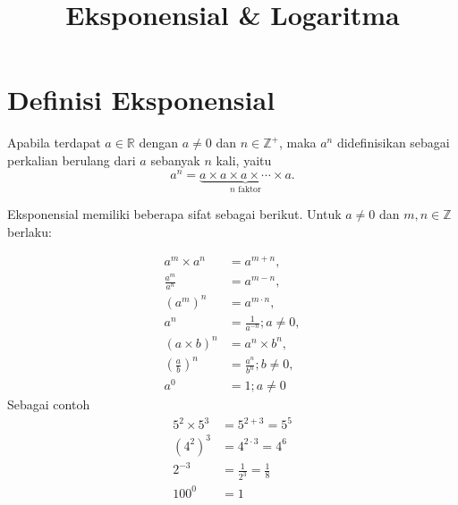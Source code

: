 \documentclass{article}
\title{\textbf{Eksponensial \& Logaritma}}
\begin{document}
\onehalfspacing

\maketitle

\section{Definisi Eksponensial}

Apabila terdapat $a \in \mathbb{R}$ dengan $a \neq 0$ dan $n \in \mathbb{Z}^+$, maka $a^n$ didefinisikan sebagai perkalian berulang dari $a$ sebanyak $n$ kali, yaitu
\[
a^n = \underbrace{a \times a \times a \times \cdots \times a}_{n\text{ faktor}}.
\]

Eksponensial memiliki beberapa sifat sebagai berikut. Untuk $a \neq 0$ dan $m,n \in \mathbb{Z}$ berlaku:

\[
\begin{aligned}
a^m \times a^n &= a^{m+n},\\
\frac{a^m}{a^n} &= a^{m-n},\\
(a^m)^n &= a^{m \cdot n},\\
a^n &= \frac{1}{a^{-n}};a \neq 0,\\
(a \times b)^n &=a^n \times b^n ,\\
\left( \frac{a}{b}\right)^n &= \frac{a^n}{b^n};b\neq 0,\\
a^0 &= 1;a \neq 0
\end{aligned}
\]
Sebagai contoh
\[
\begin{aligned}
    5^2 \times 5^3 &= 5^{2+3} =5^5\\
    (4^2)^3 &= 4^{2 \cdot 3} =4^6\\
    2^{-3} &= \frac{1}{2^3} = \frac{1}{8}\\
    100^0 &= 1
\end{aligned}
\]
\end{document}
